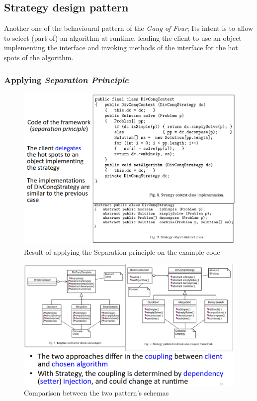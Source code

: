 \subsection{Strategy design pattern}
Another one of the behavioural pattern of the \textit{Gang of Four};
Its intent is to allow to select (part of) an algorithm at runtime, leading the client to use an object implementing the interface and
invoking methods of the interface for the hot spots of the
algorithm.

\subsubsection{Applying \textit{Separation Principle}}
\begin{figure}[htbp]
   \centering
   \includegraphics{images/dp_strategy_code.png}
   \caption{Result of applying the Separation principle on the example code}
   \label{fig:dp_strategy_code}
\end{figure}

\begin{figure}[htbp]
   \centering
   \includegraphics{images/dp_comparison.png}
   \caption{Comparison between the two pattern's schemas}
   \label{fig:dp_comparison}
\end{figure}

